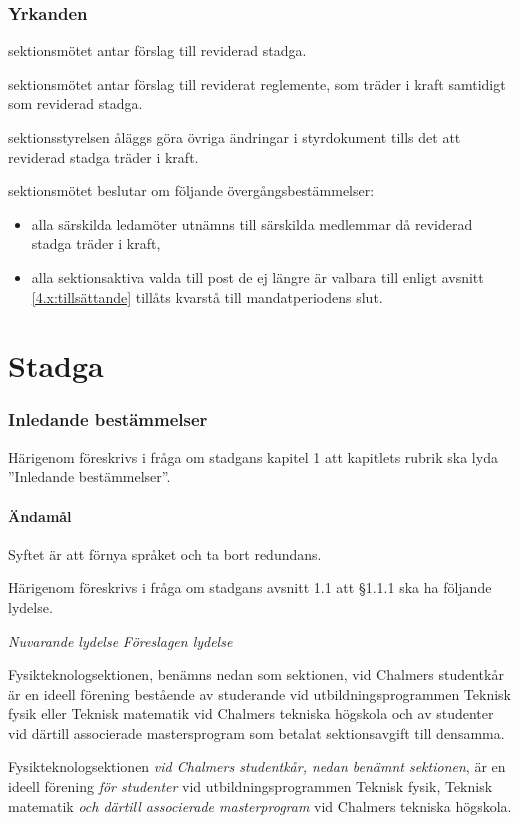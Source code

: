 \documentclass{article}
\newenvironment{lydelse}
    {\begin{paracol}{2}%
        \emph{Nuvarande lydelse}%
        \switchcolumn%
        \emph{Föreslagen lydelse}%
    \end{paracol}%
    \begin{enumerate}[label=\thesubsection.\arabic*]%
    \begin{paracol}{2}%
    }{\end{paracol}\end{enumerate}}
\begin{document}
\section*{Yrkanden}
\begin{beslut}
	\item sektionsmötet antar förslag till reviderad stadga.
	\item sektionsmötet antar förslag till reviderat reglemente, som träder i kraft samtidigt som reviderad stadga.
	\item sektionsstyrelsen åläggs göra övriga ändringar i styrdokument tills det att reviderad stadga träder i kraft.
	\item sektionsmötet beslutar om följande övergångsbestämmelser:
	\begin{itemize}
    \item alla särskilda ledamöter utnämns till särskilda medlemmar då reviderad stadga träder i kraft,
    \item alla sektionsaktiva valda till post de ej längre är valbara till enligt avsnitt \ref{4.x:tillsättande} tillåts kvarstå till mandatperiodens slut.
	\end{itemize}
\end{beslut}

\tableofcontents
\clearpage


\part{Stadga}
\section{Inledande bestämmelser}
Härigenom föreskrivs i fråga om stadgans kapitel 1 att kapitlets rubrik ska lyda ''Inledande bestämmelser''.


\subsection{Ändamål}
Syftet är att förnya språket och ta bort redundans.

Härigenom föreskrivs i fråga om stadgans avsnitt 1.1 att \S 1.1.1 ska ha följande lydelse.

\begin{lydelse}
    \item Fysikteknologsektionen, benämns nedan som sektionen, vid Chalmers studentkår är en ideell förening bestående av studerande vid utbildningsprogrammen Teknisk fysik eller Teknisk matematik vid Chalmers tekniska högskola och av studenter vid därtill associerade mastersprogram som betalat sektionsavgift till densamma.
  \switchcolumn
    \item Fysikteknologsektionen \emph{vid Chalmers studentkår, nedan benämnt sektionen}, är en ideell förening \emph{för studenter} vid utbildningsprogrammen Teknisk fysik, Teknisk matematik \emph{och därtill associerade masterprogram} vid Chalmers tekniska högskola.
\end{lydelse}
\end{document}
